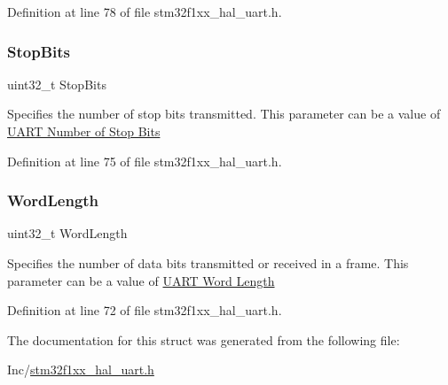 Definition at line 78 of file stm32f1xx\+\_\+hal\+\_\+uart.\+h.

\mbox{\label{struct_u_a_r_t___init_type_def_a8394ba239444e3e5fe1ada1c37cb1019}} 
\subsubsection{\texorpdfstring{Stop\+Bits}{StopBits}}
{\footnotesize\ttfamily uint32\+\_\+t Stop\+Bits}

Specifies the number of stop bits transmitted. This parameter can be a value of \hyperlink{group___u_a_r_t___stop___bits}{U\+A\+RT Number of Stop Bits} 

Definition at line 75 of file stm32f1xx\+\_\+hal\+\_\+uart.\+h.

\mbox{\label{struct_u_a_r_t___init_type_def_ae5e60b9a021fe0009588fc86c7584a5a}} 
\subsubsection{\texorpdfstring{Word\+Length}{WordLength}}
{\footnotesize\ttfamily uint32\+\_\+t Word\+Length}

Specifies the number of data bits transmitted or received in a frame. This parameter can be a value of \hyperlink{group___u_a_r_t___word___length}{U\+A\+RT Word Length} 

Definition at line 72 of file stm32f1xx\+\_\+hal\+\_\+uart.\+h.



The documentation for this struct was generated from the following file\+:\begin{DoxyCompactItemize}
\item 
Inc/\hyperlink{stm32f1xx__hal__uart_8h}{stm32f1xx\+\_\+hal\+\_\+uart.\+h}\end{DoxyCompactItemize}
